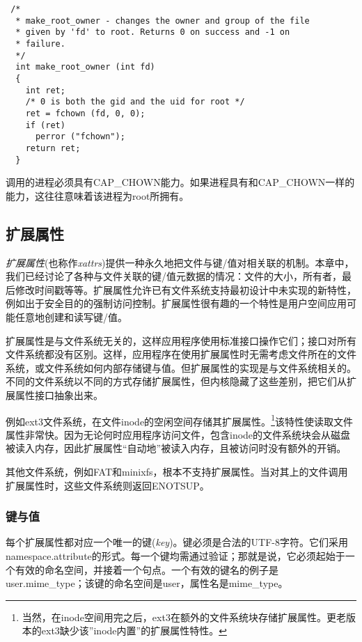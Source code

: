 \begin{lstlisting}
 /*
  * make_root_owner - changes the owner and group of the file
  * given by 'fd' to root. Returns 0 on success and -1 on
  * failure.
  */
  int make_root_owner (int fd)
  {
    int ret;
    /* 0 is both the gid and the uid for root */
    ret = fchown (fd, 0, 0);
    if (ret)
      perror ("fchown");
    return ret;
  }
\end{lstlisting}

调用的进程必须具有CAP\_CHOWN能力。如果进程具有和CAP\_CHOWN一样的能力，这往往意味着该进程为root所拥有。

\subsection{扩展属性}

\emph{扩展属性}(也称作\emph{xattrs})提供一种永久地把文件与键/值对相关联的机制。本章中，我们已经讨论了各种与文件关联的键/值元数据的情况：文件的大小，所有者，最后修改时间戳等等。扩展属性允许已有文件系统支持最初设计中未实现的新特性，例如出于安全目的的强制访问控制。扩展属性很有趣的一个特性是用户空间应用可能任意地创建和读写键/值。

扩展属性是与文件系统无关的，这样应用程序使用标准接口操作它们；接口对所有文件系统都没有区别。这样，应用程序在使用扩展属性时无需考虑文件所在的文件系统，或文件系统如何内部存储键与值。但扩展属性的实现是与文件系统相关的。不同的文件系统以不同的方式存储扩展属性，但内核隐藏了这些差别，把它们从扩展属性接口抽象出来。

例如ext3文件系统，在文件inode的空闲空间存储其扩展属性。\footnote[1]{当然，在inode空间用完之后，ext3在额外的文件系统块存储扩展属性。更老版本的ext3缺少该''inode内置''的扩展属性特性。}该特性使读取文件属性非常快。因为无论何时应用程序访问文件，包含inode的文件系统块会从磁盘被读入内存，因此扩展属性“自动地”被读入内存，且被访问时没有额外的开销。

其他文件系统，例如FAT和minixfs，根本不支持扩展属性。当对其上的文件调用扩展属性时，这些文件系统则返回ENOTSUP。

\subsubsection{键与值}

每个扩展属性都对应一个唯一的键(\emph{key})。键必须是合法的UTF-8字符。它们采用namespace.attribute的形式。每一个键均需通过验证；那就是说，它必须起始于一个有效的命名空间，并接着一个句点。一个有效的键名的例子是user.mime\_type；该键的命名空间是user，属性名是mime\_type。

